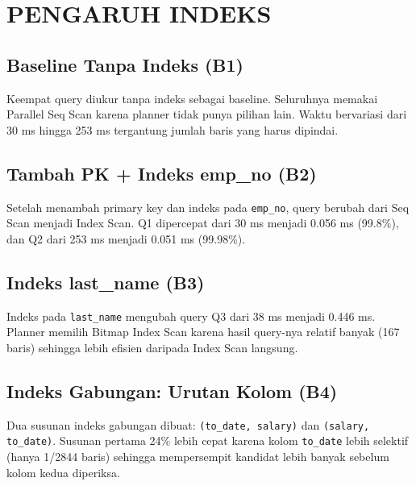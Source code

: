 \chapter{PENGARUH INDEKS}

\section{Baseline Tanpa Indeks (B1)}
Keempat query diukur tanpa indeks sebagai baseline. Seluruhnya memakai Parallel Seq Scan karena planner tidak punya pilihan lain. Waktu bervariasi dari 30 ms hingga 253 ms tergantung jumlah baris yang harus dipindai.


\section{Tambah PK + Indeks emp\_no (B2)}
Setelah menambah primary key dan indeks pada \texttt{emp\_no}, query berubah dari Seq Scan menjadi Index Scan. Q1 dipercepat dari 30 ms menjadi 0.056 ms (99.8\%), dan Q2 dari 253 ms menjadi 0.051 ms (99.98\%).


\section{Indeks last\_name (B3)}
Indeks pada \texttt{last\_name} mengubah query Q3 dari 38 ms menjadi 0.446 ms. Planner memilih Bitmap Index Scan karena hasil query-nya relatif banyak (167 baris) sehingga lebih efisien daripada Index Scan langsung.


\section{Indeks Gabungan: Urutan Kolom (B4)}
Dua susunan indeks gabungan dibuat: \texttt{(to\_date, salary)} dan \texttt{(salary, to\_date)}. Susunan pertama 24\% lebih cepat karena kolom \texttt{to\_date} lebih selektif (hanya 1/2844 baris) sehingga mempersempit kandidat lebih banyak sebelum kolom kedua diperiksa.



